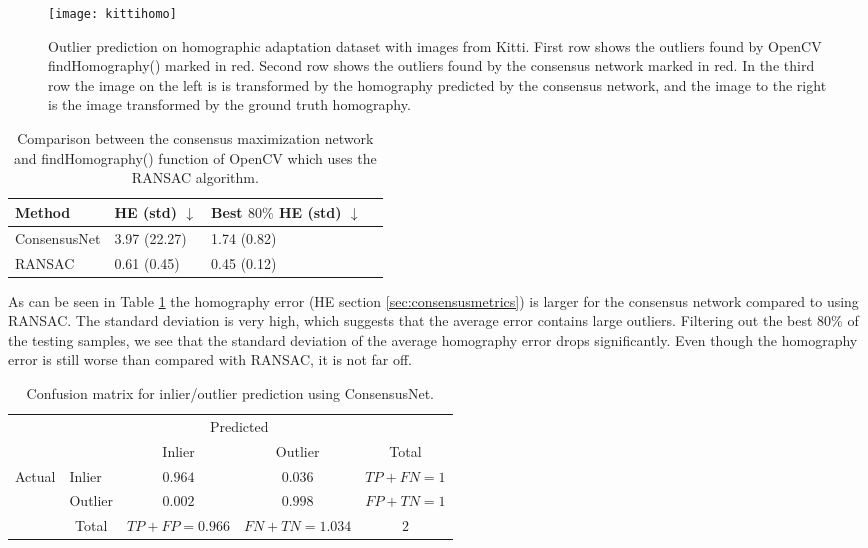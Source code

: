 \begin{figure}[H]
	\centering
	\texttt{[image: kittihomo]}
	\caption{Outlier prediction on homographic adaptation dataset with images from Kitti. First row shows the outliers found by OpenCV findHomography() marked in red. Second row shows the outliers found by the consensus network marked in red. In the third row the image on the left is is transformed by the homography predicted by the consensus network, and the image to the right is the image transformed by the ground truth homography.}
	\label{fig:kittihomo}
\end{figure}

\begin{table}[H]
	\centering
	\begin{tabular}{|l|l|l|l|}
		\hline
		Method & HE (std) $\downarrow$ & Best $80\%$ HE (std) $\downarrow$ \\
		\hline
		ConsensusNet & 3.97 (22.27) & 1.74 (0.82) \\
		RANSAC & 0.61 (0.45) & 0.45 (0.12) \\
		\hline
	\end{tabular}
	\caption{Comparison between the consensus maximization network and findHomography() function of OpenCV which uses the RANSAC algorithm.}
	\label{table:consensusbenchmark}
\end{table}

As can be seen in Table \ref{table:consensusbenchmark} the homography error (HE section \ref{sec:consensusmetrics}) is larger for the consensus network compared to using RANSAC. The standard deviation is very high, which suggests that the average error contains large outliers. Filtering out the best 80\% of the testing samples, we see that the standard deviation of the average homography error drops significantly. Even though the homography error is still worse than compared with RANSAC, it is not far off.

\begin{table}[H]
\centering
\begin{tabular}{l|l|c|c|c}
	\multicolumn{2}{c}{}&\multicolumn{2}{c}{Predicted}&\\
	\cline{3-4}
	\multicolumn{2}{c|}{}&Inlier&Outlier&\multicolumn{1}{c}{Total}\\
	\cline{2-4}
	\multirow{2}{*}{Actual}& Inlier & $0.964$ & $0.036$ & $TP+FN=1$\\
	\cline{2-4}
	& Outlier & $0.002$ & $0.998$ & $FP+TN=1$\\
	\cline{2-4}
	\multicolumn{1}{c}{} & \multicolumn{1}{c}{Total} & \multicolumn{1}{c}{$TP+FP=0.966$} & \multicolumn{    1}{c}{$FN+TN=1.034$} & \multicolumn{1}{c}{$2$}\\
\end{tabular}
	\caption{Confusion matrix for inlier/outlier prediction using ConsensusNet.}
	\label{table:consensusnetconfusion}
\end{table}



